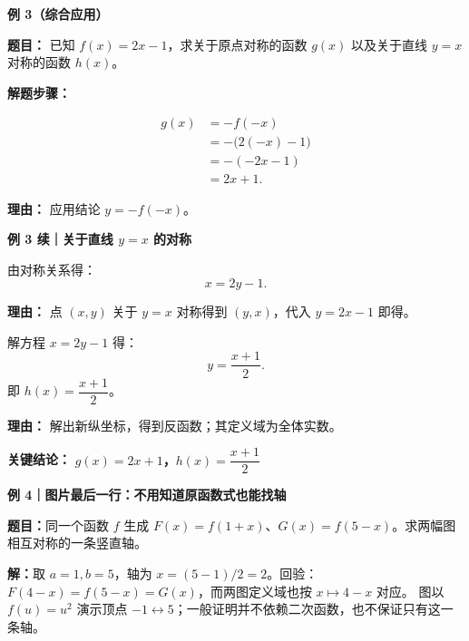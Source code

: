 \clearpage
\begin{examplebox}
\textbf{\textcolor{CExample}{例 3（综合应用）}}



	\textbf{\textcolor{CExample}{题目：}}
	已知 $f(x)=2x-1$，求关于原点对称的函数 $g(x)$ 以及关于直线 $y=x$ 对称的函数 $h(x)$。

	\textbf{\textcolor{CExample}{解题步骤：}}
	\begin{description}[style=nextline, leftmargin=2.8em, labelsep=0.5em, itemsep=0.45em]
		\item[\textbf{第一步（原点对称）：}]
			\[
				\begin{aligned}
					g(x) &= -f(-x) \\
					&= -\bigl(2(-x)-1\bigr) \\
					&= -(-2x-1) \\
					&= 2x+1.
			\end{aligned}
			\]
			\par\textbf{理由：} 应用结论 $y=-f(-x)$。

		\end{description}
\end{examplebox}
\clearpage
\begin{examplebox}
\textbf{例 3 续｜关于直线 $y=x$ 的对称}

\begin{description}[style=nextline,leftmargin=2.8em,itemsep=.45em]
\item[\textbf{第二步（对称方程）：}]

			由对称关系得：
			\[
				x = 2y-1.
			\]
			\par\textbf{理由：} 点 $(x,y)$ 关于 $y=x$ 对称得到 $(y,x)$，代入 $y=2x-1$ 即得。

		\item[\textbf{第三步（解出函数）：}]
			解方程 $x = 2y-1$ 得：
			\[
				y = \frac{x+1}{2}.
			\]
			即 $h(x)=\dfrac{x+1}{2}$。
			\par\textbf{理由：} 解出新纵坐标，得到反函数；其定义域为全体实数。
	\end{description}

	\textbf{\textcolor{CExample}{关键结论：}}
	\textbf{$g(x)=2x+1$，$h(x)=\dfrac{x+1}{2}$}
\end{examplebox}
\clearpage
\begin{examplebox}
\textbf{例 4｜图片最后一行：不用知道原函数式也能找轴}


\textbf{题目：}同一个函数 $f$ 生成 $F(x)=f(1+x)$、$G(x)=f(5-x)$。求两幅图相互对称的一条竖直轴。

\textbf{解：}取 $a=1,b=5$，轴为 $x=(5-1)/2=2$。回验：$F(4-x)=f(5-x)=G(x)$，而两图定义域也按 $x\mapsto4-x$ 对应。
图以 $f(u)=u^2$ 演示顶点 $-1\leftrightarrow5$；一般证明并不依赖二次函数，也不保证只有这一条轴。

\end{examplebox}
